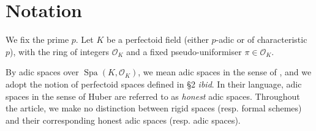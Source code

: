 \documentclass[10pt,oneside]{amsart}
\theoremstyle{definition}
\newtheorem{question}[mainthm]{Question}
\newtheorem*{example}{Example}
\begin{document}
 \begin{comment}
Now we end the introduction by describing the content of each section. 

	\begin{question} \label{question_intro}
	    \begin{enumerate} 
	    \item		Given a rigid group $G$, when is there an adic space $G_\infty$ such that $G_\infty \sim  \varprojlim_{[p]} G ?$
	    \item If it exists, and $K$ is perfectoid, when is $G_\infty$ perfectoid?
	    \end{enumerate}
	\end{question}
 
 
	But before we give proofs for examples of rigid groups $G$ for which a perfectoid tilde-limit exists, we first note that the second question certainly doesn't have an affirmative answer for all rigid group varieties:
	\begin{example}
		For the additive group $\mathbb G_a^{\operatorname{an}}$, we know that $[p]$ is an isomorphism and therefore $\varprojlim_{[p]} \mathbb G_a=\mathbb G_a$ exists (even as an actual limit in the category of adic spaces) but is certainly not perfectoid.
	\end{example}

\end{comment} 
 
 


\section*{Notation}
	We fix the prime $p$.  Let $K$ be a perfectoid field (either $p$-adic or of characteristic $p$), with the ring of integers  $\mathcal O_K$  and  a fixed pseudo-uniformiser $\pi\in \mathcal O_K$. 
	
	By adic spaces over $\operatorname{Spa}(K,\mathcal O_K)$, we mean adic spaces in the sense of \cite{SW}, and we adopt the notion of perfectoid spaces defined in \S2 \textit{\small ibid}. In their language, adic spaces in the sense of Huber are referred to as \textit{honest} adic spaces. Throughout the article, we make no distinction between rigid spaces (resp. formal schemes) and their corresponding honest adic spaces (resp. adic spaces). 
	
\end{document}
